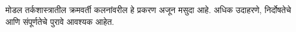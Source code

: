 \documentclass[../../../include/open-logic-chapter]{subfiles}
\begin{document}
\begin{editorial}
  मोडल तर्कशास्त्रातील क्रमवर्ती कलनांवरील हे प्रकरण
  अजून मसुदा आहे. अधिक उदाहरणे, निर्दोषतेचे आणि
  संपूर्णतेचे पुरावे आवश्यक आहेत.
\end{editorial}


\OLEndChapterHook
\end{document}
